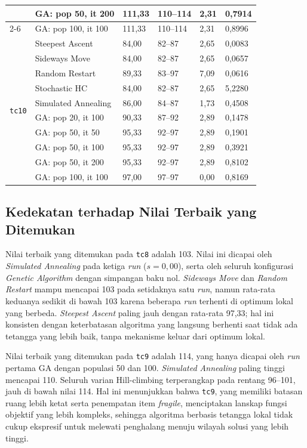 \begin{longtable}{|p{1.5cm}|p{3.2cm}|p{1.1cm}|p{1.8cm}|p{1.9cm}|p{2.3cm}|}
 & GA: pop 50, it 200 & 111,33 & 110--114 & 2,31 & 0,7914 \\ \cline{2-6}
 & GA: pop 100, it 100 & 111,33 & 110--114 & 2,31 & 0,8996 \\ \hline
\multirow{10}{*}{\texttt{tc10}} & Steepest Ascent & 84,00 & 82--87 & 2,65 & 0,0083 \\ \cline{2-6}
 & Sideways Move & 84,00 & 82--87 & 2,65 & 0,0657 \\ \cline{2-6}
 & Random Restart & 89,33 & 83--97 & 7,09 & 0,0616 \\ \cline{2-6}
 & Stochastic HC & 84,00 & 82--87 & 2,65 & 5,2280 \\ \cline{2-6}
 & Simulated Annealing & 86,00 & 84--87 & 1,73 & 0,4508 \\ \cline{2-6}
 & GA: pop 20, it 100 & 90,33 & 87--92 & 2,89 & 0,1478 \\ \cline{2-6}
 & GA: pop 50, it 50 & 95,33 & 92--97 & 2,89 & 0,1901 \\ \cline{2-6}
 & GA: pop 50, it 100 & 95,33 & 92--97 & 2,89 & 0,3921 \\ \cline{2-6}
 & GA: pop 50, it 200 & 95,33 & 92--97 & 2,89 & 0,8102 \\ \cline{2-6}
 & GA: pop 100, it 100 & 97,00 & 97--97 & 0,00 & 0,8169 \\ \hline
\end{longtable}

\subsection{Kedekatan terhadap Nilai Terbaik yang Ditemukan}

Nilai terbaik yang ditemukan pada \texttt{tc8} adalah 103. Nilai ini dicapai oleh \textit{Simulated Annealing} pada ketiga \textit{run} ($s = 0{,}00$), serta oleh seluruh konfigurasi \textit{Genetic Algorithm} dengan simpangan baku nol. \textit{Sideways Move} dan \textit{Random Restart} mampu mencapai 103 pada setidaknya satu \textit{run}, namun rata-rata keduanya sedikit di bawah 103 karena beberapa \textit{run} terhenti di optimum lokal yang berbeda. \textit{Steepest Ascent} paling jauh dengan rata-rata 97,33; hal ini konsisten dengan keterbatasan algoritma yang langsung berhenti saat tidak ada tetangga yang lebih baik, tanpa mekanisme keluar dari optimum lokal.

Nilai terbaik yang ditemukan pada \texttt{tc9} adalah 114, yang hanya dicapai oleh \textit{run} pertama GA dengan populasi 50 dan 100. \textit{Simulated Annealing} paling tinggi mencapai 110. Seluruh varian Hill-climbing terperangkap pada rentang 96--101, jauh di bawah nilai 114. Hal ini menunjukkan bahwa \texttt{tc9}, yang memiliki batasan ruang lebih ketat serta penempatan item \textit{fragile}, menciptakan lanskap fungsi objektif yang lebih kompleks, sehingga algoritma berbasis tetangga lokal tidak cukup ekspresif untuk melewati penghalang menuju wilayah solusi yang lebih tinggi.

